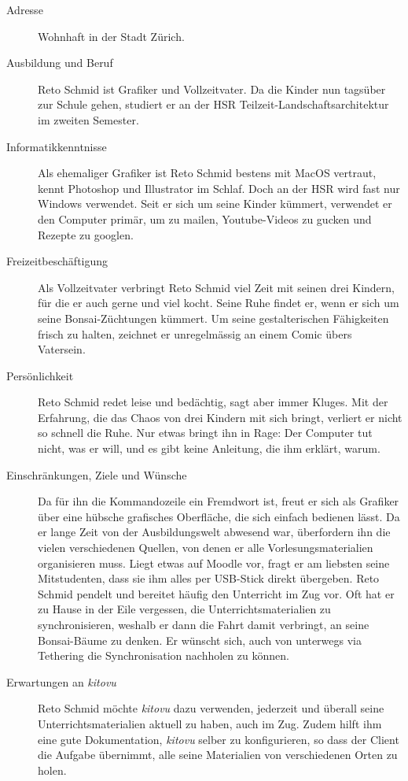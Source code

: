\documentclass[a4paper]{article}
\begin{document}
\begin{description}
	\item[Adresse] Wohnhaft in der Stadt Zürich.
	\item[Ausbildung und Beruf] Reto Schmid ist Grafiker und Vollzeitvater. Da die Kinder nun tagsüber zur Schule gehen, studiert er an der HSR Teilzeit-Landschaftsarchitektur im zweiten Semester.
	\item[Informatikkenntnisse] Als ehemaliger Grafiker ist Reto Schmid bestens mit MacOS vertraut, kennt Photoshop und Illustrator im Schlaf. Doch an der HSR wird fast nur Windows verwendet. Seit er sich um seine Kinder kümmert, verwendet er den Computer primär, um zu mailen, Youtube-Videos zu gucken und Rezepte zu googlen.
	\item[Freizeitbeschäftigung] Als Vollzeitvater verbringt Reto Schmid viel Zeit mit seinen drei Kindern, für die er auch gerne und viel kocht. Seine Ruhe findet er, wenn er sich um seine Bonsai-Züchtungen kümmert. Um seine gestalterischen Fähigkeiten frisch zu halten, zeichnet er unregelmässig an einem Comic übers Vatersein.
	\item[Persönlichkeit] Reto Schmid redet leise und bedächtig, sagt aber immer Kluges. Mit der Erfahrung, die das Chaos von drei Kindern mit sich bringt, verliert er nicht so schnell die Ruhe. Nur etwas bringt ihn in Rage: Der Computer tut nicht, was er will, und es gibt keine Anleitung, die ihm erklärt, warum.
	\item[Einschränkungen, Ziele und Wünsche] 
	Da für ihn die Kommandozeile ein Fremdwort ist, freut er sich als Grafiker über eine hübsche grafisches Oberfläche, die sich einfach bedienen lässt. Da er lange Zeit von der Ausbildungswelt abwesend war, überfordern ihn die vielen verschiedenen Quellen, von denen er alle Vorlesungsmaterialien organisieren muss. Liegt etwas auf Moodle vor, fragt er am liebsten seine Mitstudenten, dass sie ihm alles per USB-Stick direkt übergeben. \linebreak
	Reto Schmid pendelt und bereitet häufig den Unterricht im Zug vor. Oft hat er zu Hause in der Eile vergessen, die Unterrichtsmaterialien zu synchronisieren, weshalb er dann die Fahrt damit verbringt, an seine Bonsai-Bäume zu denken. Er wünscht sich, auch von unterwegs via Tethering die Synchronisation nachholen zu können.
	\item[Erwartungen an \emph{kitovu}] Reto Schmid möchte \emph{kitovu} dazu verwenden, jederzeit und überall seine Unterrichtsmaterialien aktuell zu haben, auch im Zug. Zudem hilft ihm eine gute Dokumentation, \emph{kitovu} selber zu konfigurieren, so dass der Client die Aufgabe übernimmt, alle seine Materialien von verschiedenen Orten zu holen.
	
\end{description}
\end{document}
